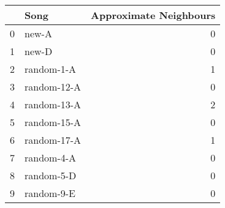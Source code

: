 \begin{tabular}{llr}
\toprule
 & Song & Approximate Neighbours \\
\midrule
0 & new-A & 0 \\
1 & new-D & 0 \\
2 & random-1-A & 1 \\
3 & random-12-A & 0 \\
4 & random-13-A & 2 \\
5 & random-15-A & 0 \\
6 & random-17-A & 1 \\
7 & random-4-A & 0 \\
8 & random-5-D & 0 \\
9 & random-9-E & 0 \\
\bottomrule
\end{tabular}
